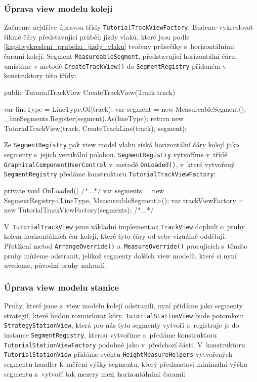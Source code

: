 \subsubsection*{Úprava view modelu kolejí}
Začneme nejdříve úpravou třídy \texttt{TutorialTrackViewFactory}. Budeme vykreslovat šikmé čáry představující průběh jízdy vlaků, které jsou podle \ref{kap4:vykresleni_prubehu_jizdy_vlaku} tvořeny průsečíky s~horizontálními čarami kolejí. Segment \texttt{MeasureableSegment}, představující horizontální čáru,  umístíme v metodě \texttt{CreateTrackView()} do \linebreak \texttt{SegmentRegistry} přidaném v konstruktory této třídy:

\begin{csharpcode}
public TutorialTrackView CreateTrackView(Track track) {

	var lineType = LineType.Of(track);
	var segment = new MeasureableSegment();
	_lineSegments.Register(segment).As(lineType);
	return new TutorialTrackView(track, CreateTrackLine(track), segment);
}
\end{csharpcode}

Ze \texttt{SegmentRegistry} pak view model vlaku získá horizontální čáry kolejí jako segmenty s~jejich vertikální polohou. \texttt{SegmentRegistry} vytvoříme v~třídě \texttt{GraphicalComponentUserControl} v~metodě \texttt{OnLoaded()}, v~které vytvořený \linebreak \texttt{SegmentRegistry} předáme konstruktoru \texttt{TutorialTrackViewFactory}:

\begin{csharpcode}
 private void OnLoaded() {
  /*...*/
  var segments = new SegmentRegistry<LineType, MeasureableSegment>();
  var trackViewFactory = new TutorialTrackViewFactory(segments);
  /*...*/
}
\end{csharpcode}

V~\texttt{TutorialTrackView} jsme základní implementaci \texttt{TrackView} doplnili \linebreak o~pruhy kolem horizontálních čar kolejí, které tyto čáry od sebe vizuálně oddělují. Přetížení metod \texttt{ArrangeOverride()} a~\texttt{MeasureOverride()} pracujících s~těmito pruhy můžeme odstranit, jelikož segmenty dalších view modelů, které si nyní uvedeme, původní pruhy nahradí.

\subsubsection*{Úprava view modelu stanice}
Pruhy, které jsme z~view modelu kolejí odstranili, nyní přidáme jako segmenty strategií, které budou rozmisťovat kóty. \texttt{TutorialStationView} bude potomkem  \texttt{StrategyStationView}, která pro nás tyto segmenty vytvoří a~registruje je do instance \texttt{SegmentRegistry}, kterou vytvoříme a~předáme konstruktoru  \texttt{TutorialStationViewFactory} podobně jako v~předchozí části. V~konstruktoru \texttt{TutorialStationView} přidáme eventu \texttt{HeightMeasureHelpers} vytvořených segmentů handler k~měření výšky segmentu, který přednastaví minimální výšku segmentu a~vytvoří tak mezery mezi horizontálními čarami:

